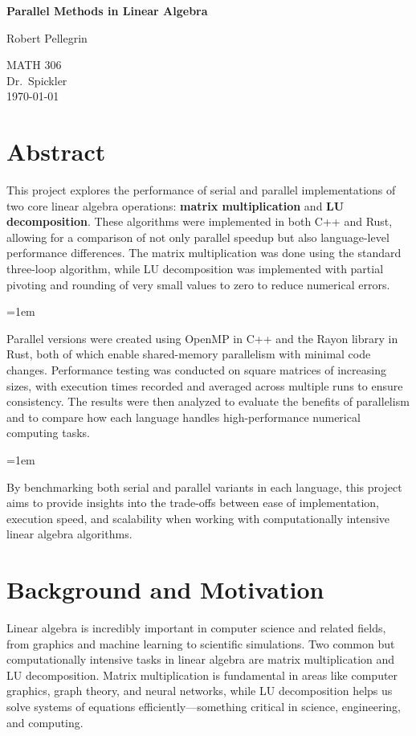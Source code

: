 \documentclass[12pt]{article}
\begin{document}
\begin{titlepage}
    \centering
    \vspace*{2in}
    {\Huge\bfseries Parallel Methods in Linear Algebra\par}
    \vspace{1in}
    {\Large Robert Pellegrin\par}
    \vspace{0.5in}
    {\large MATH 306\\ Dr.\ Spickler \\ \today\par}
    \vfill
\end{titlepage}

\newpage
\section*{Abstract}
This project explores the performance of serial and parallel implementations of two core linear algebra operations: \textbf{matrix multiplication}
and \textbf{LU decomposition}. These algorithms were implemented in both C++ and Rust, allowing for a comparison of not only parallel speedup but
also language-level performance differences. The matrix multiplication was done using the standard three-loop algorithm, while LU decomposition
was implemented with partial pivoting and rounding of very small values to zero to reduce numerical errors.

\parskip=1em

Parallel versions were created using OpenMP in C++ and the Rayon library in Rust, both of which enable shared-memory parallelism with minimal
code changes. Performance testing was conducted on square matrices of increasing sizes, with execution times recorded and averaged across
multiple runs to ensure consistency. The results were then analyzed to evaluate the benefits of parallelism and to compare how each language
handles high-performance numerical computing tasks.

\parskip=1em

By benchmarking both serial and parallel variants in each language, this project aims to provide insights into the trade-offs between ease of
implementation, execution speed, and scalability when working with computationally intensive linear algebra algorithms.

\section{Background and Motivation}
Linear algebra is incredibly important in computer science and related fields, from graphics and machine learning to scientific simulations.
Two common but computationally intensive tasks in linear algebra are matrix multiplication and LU decomposition. Matrix multiplication is fundamental
in areas like computer graphics, graph theory, and neural networks, while LU decomposition helps us solve systems of equations
efficiently---something critical in science, engineering, and computing.
\end{document}
